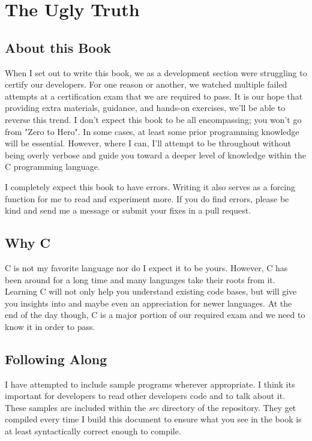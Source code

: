 \documentclass[../main.tex]{subfiles}
\begin{document}
	
\frontmatter
\chapter{The Ugly Truth}
\section{About this Book}
When I set out to write this book, we as a development section were struggling to certify our developers.  For one reason or another, we watched multiple failed attempts at a certification exam that we are required to pass. It is our hope that providing extra materials, guidance, and hands-on exercises, we'll be able to reverse this trend.  I don't expect this book to be all encompassing; you won't go from "Zero to Hero".  In some cases, at least some prior programming knowledge will be essential.  However, where I can, I'll attempt to be throughout without being overly verbose and guide you toward a deeper level of knowledge within the C programming language.

I completely expect this book to have errors.  Writing it also serves as a forcing function for me to read and experiment more.  If you do find errors, please be kind and send me a message or submit your fixes in a pull request.

\section{Why C}
C is not my favorite language nor do I expect it to be yours.  However, C has been around for a long time and many languages take their roots from it.  Learning C will not only help you understand existing code bases, but will give you insights into and maybe even an appreciation for newer languages.  At the end of the day though, C is a major portion of our required exam and we need to know it in order to pass.

\section{Following Along}
I have attempted to include sample programs wherever appropriate.  I think its important for developers to read other developers code and to talk about it.  These samples are included within the \textit{src} directory of the repository.  They get compiled every time I build this document to ensure what you see in the book is at least syntactically correct enough to compile.
\end{document}

